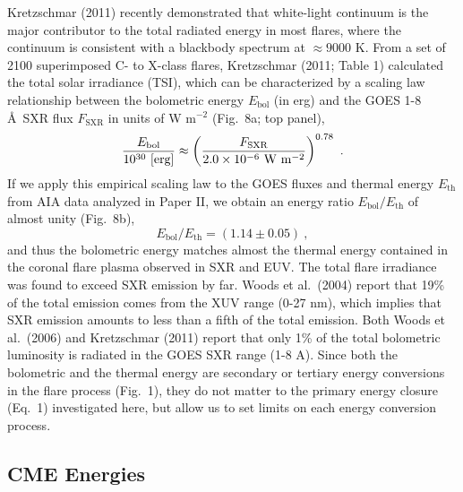 \documentclass[10pt,preprint]{aastex}  %
\def\ang{\AA}
\begin{document}
Kretzschmar (2011) recently demonstrated that white-light continuum
is the major contributor to the total radiated energy in most
flares, where the continuum is consistent with a blackbody
spectrum at $\approx 9000$ K. From a set of 2100 superimposed
C- to X-class flares, Kretzschmar (2011; Table 1) 
calculated the total solar
irradiance (TSI), which can be characterized by a scaling law
relationship between the bolometric energy $E_{\mathrm{bol}}$ (in erg) 
and the GOES 1-8 \ang\ SXR flux $F_{\mathrm{SXR}}$ in units of 
W m$^{-2}$ (Fig.~8a; top panel),
\begin{equation}
	{ E_{\mathrm{bol}} \over 10^{30} \ {\rm [erg]} } 
	\approx \left( {F_{\mathrm{SXR}} \over 
	2.0 \times 10^{-6}\ {\rm W}\ {\rm m}^{-2}} \right)^{0.78} \ .
\end{equation}
If we apply this empirical scaling law to the GOES fluxes and
thermal energy $E_{\mathrm{th}}$ from AIA data analyzed in Paper II, 
we obtain an energy ratio $E_{\mathrm{bol}}/E_{\mathrm{th}}$ of almost unity 
(Fig.~8b),
\begin{equation}
	E_{\mathrm{bol}} / E_{\mathrm{th}} = (1.14 \pm 0.05) \ ,
\end{equation}
and thus the bolometric energy matches
almost the thermal energy contained in the coronal flare plasma
observed in SXR and EUV. The total flare irradiance 
was found to exceed SXR emission by far. 
Woods et al.~(2004) report that 19\% of the total emission comes from the
XUV range (0-27 nm), which implies that SXR emission amounts to less than
a fifth of the total emission. Both Woods et al.~(2006)
and Kretzschmar (2011) report that only 1\% of the total bolometric
luminosity is radiated in the GOES SXR range (1-8 A).
Since both the bolometric and
the thermal energy are secondary or tertiary energy conversions
in the flare process (Fig.~1), they do not matter to the primary energy
closure (Eq.~1) investigated here, but allow us to set limits
on each energy conversion process. 

\subsection{		CME Energies				}
\end{document}
